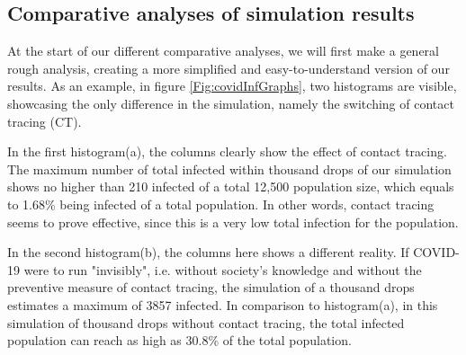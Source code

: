 \subsection{Comparative analyses of simulation results}

At the start of our different comparative analyses, we will first make a general rough analysis, creating a more simplified and easy-to-understand version of our results. As an example, in figure \ref{Fig:covidInfGraphs}, two histograms are visible, showcasing the only difference in the  simulation, namely the switching of contact tracing (CT). 

In the first histogram(a), the columns clearly show the effect of contact tracing. The maximum number of total infected within thousand drops of our simulation shows no higher than 210 infected of a total 12,500 population size, which equals to 1.68\% being infected of a total population. In other words, contact tracing seems to prove effective, since this is a very low total infection for the population. 

In the second histogram(b), the columns here shows a different reality. If COVID-19 were to run "invisibly", i.e. without society's knowledge and without the preventive measure of contact tracing, the simulation of a thousand drops estimates a maximum of 3857 infected. In comparison to histogram(a), in this simulation of thousand drops without contact tracing, the total infected population can reach as high as 30.8\% of the total population. 

